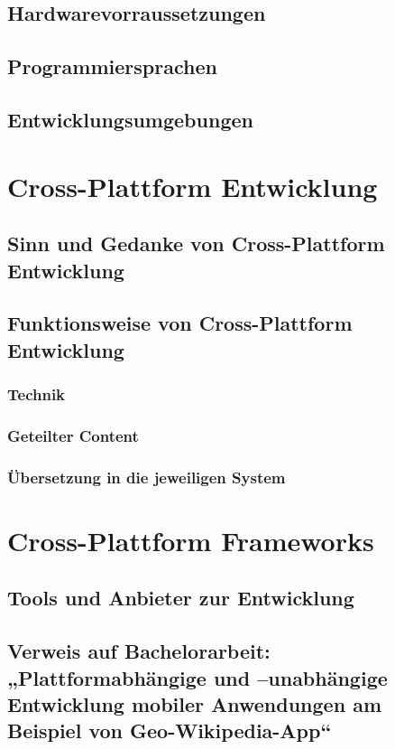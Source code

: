 \section{Hardwarevorraussetzungen}
\section{Programmiersprachen}
\section{Entwicklungsumgebungen}

\chapter{Cross-Plattform Entwicklung}
\section{Sinn und Gedanke von Cross-Plattform Entwicklung}
\section{Funktionsweise von Cross-Plattform Entwicklung}
\subsection{Technik}
\subsection{Geteilter Content}
\subsection{Übersetzung in die jeweiligen System}

\chapter{Cross-Plattform Frameworks}
\section{Tools und Anbieter zur Entwicklung}
\section{Verweis auf Bachelorarbeit: „Plattformabhängige und –unabhängige Entwicklung mobiler Anwendungen am Beispiel von Geo-Wikipedia-App“}
